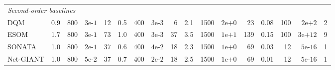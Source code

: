 \documentclass[11pt,a4paper]{article}
\begin{document}
\begin{table}[t]
{\begin{tabular}{l rrrr rrrr rrrr rrrr}
				\midrule
				\multicolumn{17}{l}{\textit{Second-order baselines}} \\
				DQM    & 0.9 & 800 & $3\text{e-}1$  & 12
				& 0.5 & 400 & $3\text{e-}3$  & 6
				& 2.1 & 1500 & $2\text{e+}0$  & 23
				& 0.08 & 100 & $2\text{e+}2$  & 2 \\
				ESOM   & 1.7 & 800 & $3\text{e-}1$  & 73
				& 1.0 & 400 & $3\text{e-}3$  & 37
				& 3.5 & 1500 & $1\text{e+}1$  & 139
				& 0.15 & 100 & $3\text{e+}12$ & 9 \\
				SONATA & 1.0 & 800 & $2\text{e-}1$  & 37
				& 0.6 & 400 & $4\text{e-}2$  & 18
				& 2.3 & 1500 & $1\text{e+}0$  & 69
				& 0.03 & 12  & $5\text{e-}16$ & 1 \\
				Net-GIANT & 1.0 & 800 & $5\text{e-}2$ & 37
				& 0.7 & 400 & $2\text{e-}2$  & 18
				& 2.5 & 1500 & $1\text{e+}0$  & 69
				& 0.01 & 12  & $5\text{e-}16$ & 1 \\
				\bottomrule
		\end{tabular}}
	\end{table}
	
\end{document}
